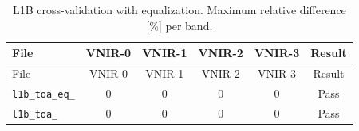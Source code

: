 \begin{longtable}{lccccc}
\caption{L1B cross-validation with equalization. Maximum relative difference [\%] per band.}\label{tab:l1b_crossval}\\
\toprule
File & VNIR-0 & VNIR-1 & VNIR-2 & VNIR-3 & Result \\
\midrule
\endfirsthead
\toprule
File & VNIR-0 & VNIR-1 & VNIR-2 & VNIR-3 & Result \\
\midrule
\endhead
\texttt{l1b\_toa\_eq\_} & $0$ & $0$ & $0$ & $0$ & Pass \\
\texttt{l1b\_toa\_} & $0$ & $0$ & $0$ & $0$ & Pass \\
\bottomrule
\end{longtable}
